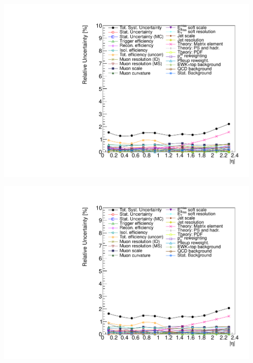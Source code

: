 {
\colb[T]
\centering
{}
\includegraphics[width=1.0\textwidth]{dates/20130602/figures/v26.allqcd/Wmn_SYSTEM_2D_PT20_NEG_Unc_2d_Slice_5}

\centering
{}
\includegraphics[width=1.0\textwidth]{dates/20130602/figures/v26.allqcd/Wmn_SYSTEM_2D_PT20_POS_Unc_2d_Slice_5}
\cole
}

